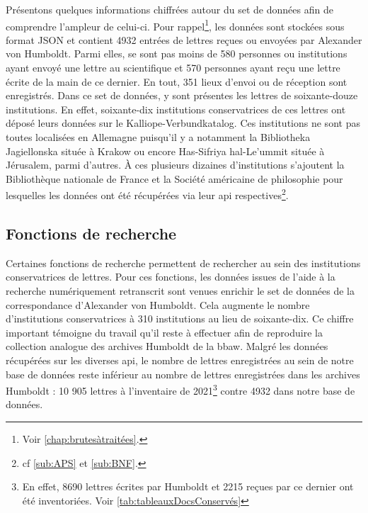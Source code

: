 \documentclass[a4paper, 12pt, twoside]{book}
\begin{document}
Présentons quelques informations chiffrées autour du set de données afin de comprendre l'ampleur de celui-ci. Pour rappel\footnote{Voir \autoref{chap:brutesàtraitées}.}, les données sont stockées sous format JSON et contient 4932 entrées de lettres reçues ou envoyées par Alexander von Humboldt. Parmi elles, se sont pas moins de 580 personnes ou institutions ayant envoyé une lettre au scientifique et 570 personnes ayant reçu une lettre écrite de la main de ce dernier. En tout, 351 lieux d'envoi ou de réception sont enregistrés. Dans ce set de données, y sont présentes les lettres de soixante-douze institutions. En effet, soixante-dix institutions conservatrices de ces lettres ont déposé leurs données sur le Kalliope-Verbundkatalog. Ces institutions ne sont pas toutes localisées en Allemagne puisqu'il y a notamment la Bibliotheka Jagiellonska située à Krakow ou encore Has-Sifriya hal-Le'ummit située à Jérusalem, parmi d'autres. À ces plusieurs dizaines d'institutions s'ajoutent la Bibliothèque nationale de France et la Société américaine de philosophie pour lesquelles les données ont été récupérées via leur \gls{api} respectives\footnote{cf \autoref{sub:APS} et \autoref{sub:BNF}.}. 

\subsection{Fonctions de recherche} 
Certaines fonctions de recherche permettent de rechercher au sein des institutions conservatrices de lettres. Pour ces fonctions, les données issues de l'aide à la recherche numériquement retranscrit sont venues enrichir le set de données de la correspondance d'Alexander von Humboldt. Cela augmente le nombre d'institutions conservatrices à 310 institutions au lieu de soixante-dix. Ce chiffre important témoigne du travail qu'il reste à effectuer afin de reproduire la collection analogue des archives Humboldt de la \gls{bbaw}. Malgré les données récupérées sur les diverses \gls{api}, le nombre de lettres enregistrées au sein de notre base de données reste inférieur au nombre de lettres enregistrées dans les archives Humboldt : 10 905 lettres à l'inventaire de 2021\footnote{En effet, 8690 lettres écrites par Humboldt et 2215 reçues par ce dernier ont été inventoriées. Voir \autoref{tab:tableauxDocsConservés}} contre 4932 dans notre base de données.
\end{document}
